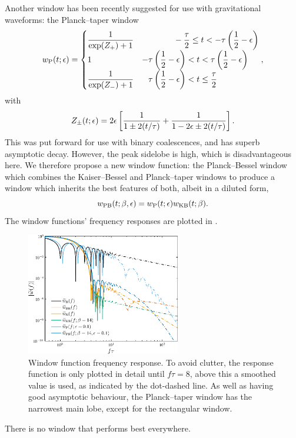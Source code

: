 Another window has been recently suggested for use with gravitational waveforms: the Planck--taper window \citep{Damour2000,McKechan2010}
\begin{equation}
w\sub{P}(t; \epsilon) = \begin{cases}
 {\displaystyle \recip{\exp(Z_+)+1}} & {\displaystyle \hphantom{\left(\recip{2} - \epsilon\right)}-\dfrac{\tau}{2} \leq t < -\tau\left(\recip{2} - \epsilon\right)} \\
 1 & {\displaystyle -\tau\left(\recip{2} - \epsilon\right) < t < \tau\left(\recip{2} - \epsilon\right)} \\
 {\displaystyle \recip{\exp(Z_-)+1}} & {\displaystyle \hphantom{-}\tau\left(\recip{2} - \epsilon\right) < t \leq \dfrac{\tau}{2}}
\end{cases},
\end{equation}
with
\begin{equation}
Z_\pm(t; \epsilon) = 2\epsilon\left[\dfrac{1}{1 \pm 2(t/\tau)} + \dfrac{1}{1 - 2\epsilon \pm 2(t/\tau)}\right].
\end{equation}
This was put forward for use with binary coalescences, and has superb asymptotic decay. However, the peak sidelobe is high, which is disadvantageous here. We therefore propose a new window function: the Planck--Bessel window which combines the Kaiser--Bessel and Planck--taper windows to produce a window which inherits the best features of both, albeit in a diluted form,
\begin{equation}
w_\mathrm{PB}(t;\beta,\epsilon) = w_\mathrm{P}(t; \epsilon)w_\mathrm{KB}(t;\beta).
\end{equation}
The window functions' frequency responses are plotted in .
\begin{figure}
  \centering
  \includegraphics[width=0.6\textwidth]{./images/Fig_Response}
    \caption{Window function frequency response. To avoid clutter, the response function is only plotted in detail until $f\tau = 8$, above this a smoothed value is used, as indicated by the dot-dashed line. As well as having good asymptotic behaviour, the Planck--taper window has the narrowest main lobe, except for the rectangular window.}
    \label{fig:Response}
\end{figure}
There is no window that performs best everywhere.

